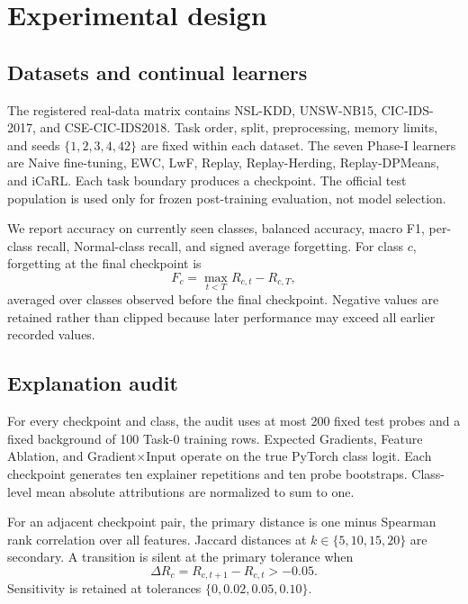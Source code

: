 \documentclass[10pt]{article}
\begin{document}
\section{Experimental design}

\subsection{Datasets and continual learners}

The registered real-data matrix contains NSL-KDD, UNSW-NB15, CIC-IDS-2017,
and CSE-CIC-IDS2018.  Task order, split, preprocessing, memory limits, and seeds
$\{1,2,3,4,42\}$ are fixed within each dataset.  The seven Phase-I learners are
Naive fine-tuning, EWC, LwF, Replay, Replay-Herding, Replay-DPMeans, and iCaRL.
Each task boundary produces a checkpoint.  The official test population is
used only for frozen post-training evaluation, not model selection.

We report accuracy on currently seen classes, balanced accuracy, macro F1,
per-class recall, Normal-class recall, and signed average forgetting.  For
class $c$, forgetting at the final checkpoint is
\begin{equation}
F_c = \max_{t<T} R_{c,t} - R_{c,T},
\end{equation}
averaged over classes observed before the final checkpoint.  Negative values
are retained rather than clipped because later performance may exceed all
earlier recorded values.

\subsection{Explanation audit}

For every checkpoint and class, the audit uses at most 200 fixed test probes
and a fixed background of 100 Task-0 training rows.  Expected Gradients,
Feature Ablation, and Gradient$\times$Input operate on the true PyTorch class
logit.  Each checkpoint generates ten explainer repetitions and ten probe
bootstraps.  Class-level mean absolute attributions are normalized to sum to
one.

For an adjacent checkpoint pair, the primary distance is one minus Spearman
rank correlation over all features.  Jaccard distances at
$k\in\{5,10,15,20\}$ are secondary.  A transition is silent at the primary
tolerance when
\begin{equation}
\Delta R_c = R_{c,t+1}-R_{c,t} > -0.05.
\end{equation}
Sensitivity is retained at tolerances $\{0,0.02,0.05,0.10\}$.
\end{document}
